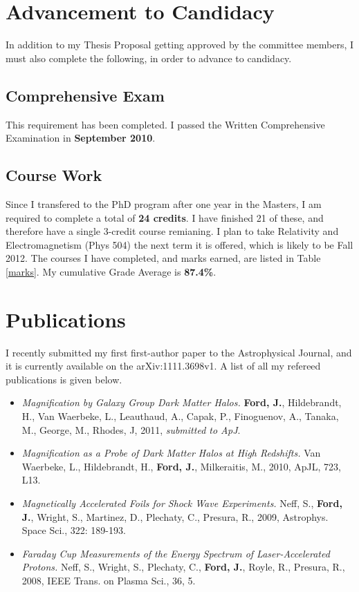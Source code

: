 \documentclass{article}
\begin{document}
\section{Advancement to Candidacy}
In addition to my Thesis Proposal getting approved by the committee members, I must also complete the following, in order to advance to candidacy.

\subsection{Comprehensive Exam}
This requirement has been completed. I passed the Written Comprehensive Examination in \textbf{September 2010}.

\subsection{Course Work}
Since I transfered to the PhD program after one year in the Masters, I am required to complete a total of \textbf{24 credits}. I have finished 21 of these, and therefore have a single 3-credit course remianing. I plan to take Relativity and Electromagnetism (Phys 504) the next term it is offered, which is likely to be Fall 2012. The courses I have completed, and marks earned, are listed in Table \ref{marks}. My cumulative Grade Average is \textbf{87.4\%}.



\section{Publications}
I recently submitted my first first-author paper to the Astrophysical Journal, and it is currently available on the arXiv:1111.3698v1. A list of all my refereed publications is given below.

\begin{itemize}
 \item
  {\it Magnification by Galaxy Group Dark Matter Halos.}
  \textbf{Ford, J.}, Hildebrandt, H., Van Waerbeke, L., Leauthaud, A., Capak, P., Finoguenov, A., Tanaka, M., George, M., Rhodes, J, 2011, \emph{submitted to ApJ}.
 \item
  {\it Magnification as a Probe of Dark Matter Halos at High Redshifts.}
  Van Waerbeke, L., Hildebrandt, H., \textbf{Ford, J.}, Milkeraitis, M., 2010, ApJL, 723, L13.
 \item
  {\it Magnetically Accelerated Foils for Shock Wave Experiments.}
  Neff, S., \textbf{Ford, J.}, Wright, S., Martinez, D., Plechaty, C., Presura, R., 2009, Astrophys. Space Sci., 322: 189-193.
 \item
  {\it Faraday Cup Measurements of the Energy Spectrum of Laser-Accelerated Protons.}
  Neff, S., Wright, S., Plechaty, C., \textbf{Ford, J.}, Royle, R., Presura, R., 2008, IEEE Trans. on Plasma Sci., 36, 5.
\end{itemize}




\end{document}
